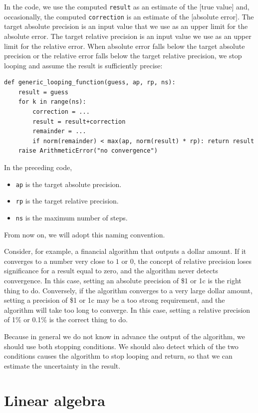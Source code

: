 \documentclass[justified, sixbynine]{tufte-book}
\def\ft{\small\tt}
\theoremstyle{plain}%
\newtheorem * {corollary}{Corollary}
\theoremstyle{definition}
\theoremstyle{remark}
\newtheorem * {remark}{Remark}
\newtheorem * {note}{Note}
\begin{document}
\begin{fullwidth}
In the code, we use the computed {\ft result} as an estimate of the [true value] and, occasionally, the computed {\ft correction} is an estimate of the [absolute error]. The target absolute precision is an input value that we use as an upper limit for the absolute error. The target relative precision is an input value we use as an upper limit for the relative error. When absolute error falls below the target absolute precision or the relative error falls below the target relative precision, we stop looping and assume the result is sufficiently precise:

\begin{lstlisting}
def generic_looping_function(guess, ap, rp, ns):
    result = guess
    for k in range(ns):
        correction = ...
        result = result+correction
        remainder = ...
        if norm(remainder) < max(ap, norm(result) * rp): return result
    raise ArithmeticError("no convergence")
\end{lstlisting}

In the preceding code, 
\begin{itemize}
\item {\ft ap} is the target absolute precision.
\item {\ft rp} is the target relative precision.
\item {\ft ns} is the maximum number of steps.
\end{itemize}
From now on, we will adopt this naming convention.


Consider, for example, a financial algorithm that outputs a dollar amount. If it converges to a number very close to $1$ or $0$, the concept of relative precision loses significance for a result equal to zero, and the algorithm never detects convergence. In this case, setting an absolute precision of \$1 or 1c is the right thing to do. Conversely, if the algorithm converges to a very large dollar amount, setting a precision of \$1 or 1c may be a too strong requirement, and the algorithm will take too long to converge. In this case, setting a relative precision of 1\% or 0.1\% is the correct thing to do.

 Because in general we do not know in advance the output of the algorithm, we should use both stopping conditions. We should also detect which of the two conditions causes the algorithm to stop looping and return, so that we can estimate the uncertainty in the result.

\goodbreak\section{Linear algebra}


\end{fullwidth}
\end{document}
